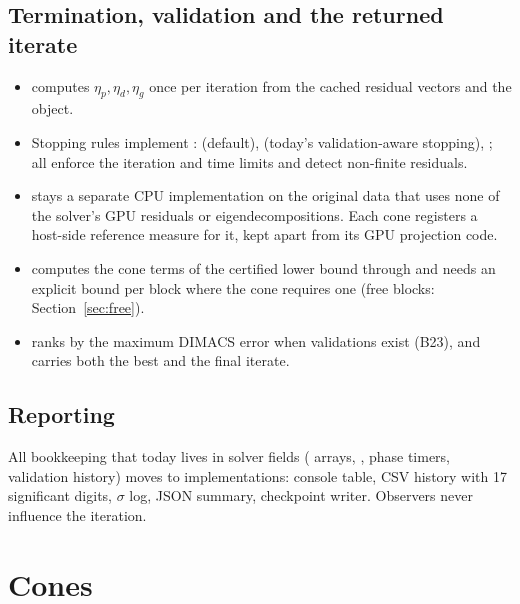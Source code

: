 \documentclass[11pt]{article}
\begin{document}
\subsection{Termination, validation and the returned iterate}\label{sec:termination}
\begin{itemize}
  \item {} computes $\eta_p,\eta_d,\eta_g$ once per iteration from the cached residual vectors
  and the  object.
  \item Stopping rules implement :  (default), 
  (today's validation-aware stopping), ; all enforce the iteration and time limits
  and detect non-finite residuals.
  \item {} stays a separate CPU implementation on the original data that uses none
  of the solver's GPU residuals or eigendecompositions. Each cone registers a host-side reference measure
  for it, kept apart from its GPU projection code.
  \item {} computes the cone terms of the certified lower bound through 
  and needs an explicit bound per block where the cone requires one (free blocks: Section~\ref{sec:free}).
  \item {} ranks by the maximum DIMACS error when validations exist (B23), and
   carries both the best and the final iterate.
\end{itemize}

\subsection{Reporting}
All bookkeeping that today lives in solver fields ( arrays, , phase timers,
validation history) moves to  implementations: console table, CSV history with 17
significant digits, $\sigma$ log, JSON summary, checkpoint writer. Observers never influence the iteration.

\section{Cones}\label{sec:cones}
\end{document}
